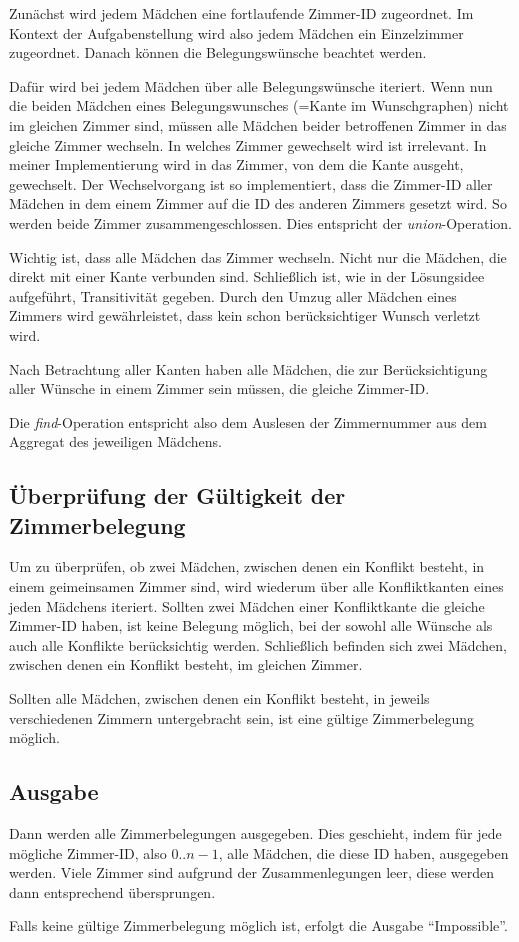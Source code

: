 Zunächst wird jedem Mädchen eine fortlaufende Zimmer-ID zugeordnet.
Im Kontext der Aufgabenstellung wird also jedem Mädchen ein Einzelzimmer zugeordnet.
Danach können die Belegungswünsche beachtet werden.

Dafür wird bei jedem Mädchen über alle Belegungswünsche iteriert.
Wenn nun die beiden Mädchen eines Belegungswunsches (=Kante im Wunschgraphen)
nicht im gleichen Zimmer sind, müssen alle Mädchen beider betroffenen Zimmer in das
gleiche Zimmer wechseln.
In welches Zimmer gewechselt wird ist irrelevant.
In meiner Implementierung wird in das Zimmer, von dem die Kante ausgeht, gewechselt.
Der Wechselvorgang ist so implementiert, dass die Zimmer-ID aller Mädchen in dem einem
Zimmer auf die ID des anderen Zimmers gesetzt wird. So werden beide Zimmer
zusammengeschlossen. Dies entspricht der \textit{union}-Operation.

Wichtig ist, dass alle Mädchen das Zimmer wechseln. Nicht nur die Mädchen,
die direkt mit einer Kante verbunden sind.
Schließlich ist, wie in der Lösungsidee aufgeführt, Transitivität gegeben.
Durch den Umzug aller Mädchen eines Zimmers wird gewährleistet,
dass kein schon berücksichtiger Wunsch verletzt wird.

Nach Betrachtung aller Kanten haben alle Mädchen,
die zur Berücksichtigung aller Wünsche in einem Zimmer sein müssen,
die gleiche Zimmer-ID.

Die \textit{find}-Operation entspricht also dem Auslesen der Zimmernummer aus dem Aggregat des jeweiligen Mädchens.

\subsection{Überprüfung der Gültigkeit der Zimmerbelegung}
Um zu überprüfen, ob zwei Mädchen, zwischen denen ein Konflikt besteht,
in einem geimeinsamen Zimmer sind,
wird wiederum über alle Konfliktkanten eines jeden Mädchens iteriert.
Sollten zwei Mädchen einer Konfliktkante die gleiche Zimmer-ID haben, ist keine Belegung möglich, bei der sowohl alle Wünsche als auch alle Konflikte berücksichtig werden.
Schließlich befinden sich zwei Mädchen, zwischen denen ein Konflikt besteht, im gleichen
Zimmer.

Sollten alle Mädchen, zwischen denen ein Konflikt besteht,
in jeweils verschiedenen Zimmern untergebracht sein,
ist eine gültige Zimmerbelegung möglich.

\subsection{Ausgabe}
Dann werden alle Zimmerbelegungen ausgegeben.
Dies geschieht, indem für jede mögliche Zimmer-ID, also \(0 .. n-1\),
alle Mädchen, die diese ID haben, ausgegeben werden.
Viele Zimmer sind aufgrund der Zusammenlegungen leer,
diese werden dann entsprechend übersprungen.

Falls keine gültige Zimmerbelegung möglich ist, erfolgt die Ausgabe "`Impossible"'.
